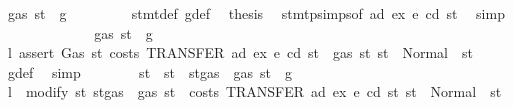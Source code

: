 \begin{isabellebody}
\ {\isachardoublequoteopen}gas\ st\ {\isasymle}\ g{\isachardoublequoteclose}\isanewline
\ \ \ \ \ \ \isamarkupfalse%
\ {}\ stmt{\isacharunderscore}{\kern0pt}def\ g{\isacharunderscore}{\kern0pt}def\ \isamarkupfalse%
\ {\isacharquery}{\kern0pt}thesis\ \isamarkupfalse%
\ stmt{\isachardot}{\kern0pt}psimps{\isacharparenleft}{\kern0pt}{}{\isacharparenright}{\kern0pt}{\isacharbrackleft}{\kern0pt}of\ ad\ ex\ e\ cd\ st{\isacharbrackright}{\kern0pt}\ \isamarkupfalse%
\ simp\isanewline
\ \ \ \ \isamarkupfalse%
\isanewline
\ \ \ \ \ \ \isamarkupfalse%
\ {\isachardoublequoteopen}{\isasymnot}\ gas\ st\ {\isasymle}\ g{\isachardoublequoteclose}\isanewline
\ \ \ \ \ \ \isamarkupfalse%
\ \isamarkupfalse%
\ l{}{\isacharcolon}{\kern0pt}\ {\isachardoublequoteopen}assert\ Gas\ {\isacharparenleft}{\kern0pt}{\isasymlambda}st{\isachardot}{\kern0pt}\ costs\ {\isacharparenleft}{\kern0pt}TRANSFER\ ad\ ex{\isacharparenright}{\kern0pt}\ e\ cd\ st\ {\isacharless}{\kern0pt}\ gas\ st{\isacharparenright}{\kern0pt}\ st\ {\isacharequal}{\kern0pt}\ Normal\ {\isacharparenleft}{\kern0pt}{\isacharparenleft}{\kern0pt}{\isacharparenright}{\kern0pt}{\isacharcomma}{\kern0pt}\ st{\isacharparenright}{\kern0pt}\ {\isachardoublequoteclose}\ \isamarkupfalse%
\ g{\isacharunderscore}{\kern0pt}def\ \isamarkupfalse%
\ simp\isanewline
\ \ \ \ \ \ \isamarkupfalse%
\ st{\isacharprime}{\kern0pt}\ \ {\isachardoublequoteopen}st{\isacharprime}{\kern0pt}\ {\isacharequal}{\kern0pt}\ st{\isasymlparr}gas\ {\isacharcolon}{\kern0pt}{\isacharequal}{\kern0pt}\ gas\ st\ {\isacharminus}{\kern0pt}\ g{\isasymrparr}{\isachardoublequoteclose}\isanewline
\ \ \ \ \ \ \isamarkupfalse%
\ \isamarkupfalse%
\ l{}{\isacharcolon}{\kern0pt}\ {\isachardoublequoteopen}\ modify\ {\isacharparenleft}{\kern0pt}{\isasymlambda}st{\isachardot}{\kern0pt}\ st{\isasymlparr}gas\ {\isacharcolon}{\kern0pt}{\isacharequal}{\kern0pt}\ gas\ st\ {\isacharminus}{\kern0pt}\ costs\ {\isacharparenleft}{\kern0pt}TRANSFER\ ad\ ex{\isacharparenright}{\kern0pt}\ e\ cd\ st{\isasymrparr}{\isacharparenright}{\kern0pt}\ st\ {\isacharequal}{\kern0pt}\ Normal\ {\isacharparenleft}{\kern0pt}{\isacharparenleft}{\kern0pt}{\isacharparenright}{\kern0pt}{\isacharcomma}{\kern0pt}\ st{\isacharprime}{\kern0pt}{\isacharparenright}{\kern0pt}{\isachardoublequoteclose}\ \isamarkupfalse%

\end{isabellebody}
